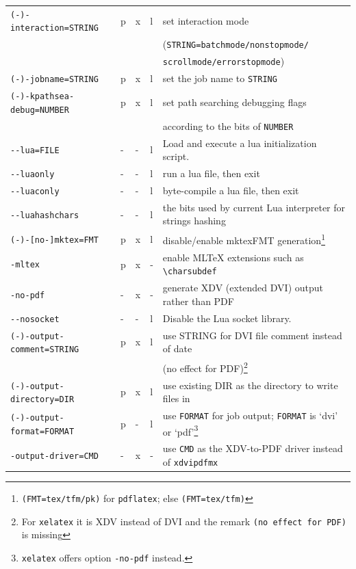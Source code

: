 \documentclass[a4paper]{article}%
\newcommand{\pdflatex}{\texttt{pdflatex}}
\newcommand{\xelatex}{\texttt{xelatex}}
\begin{document}
{\begin{longtable}{lllll}
\texttt{(-)-interaction=STRING}    & p&x&l & set interaction mode \\
                                   &  & &  & (\texttt{STRING=batchmode/nonstopmode/} \\
                                   &  & &  &  \texttt{scrollmode/errorstopmode}) \\
\texttt{(-)-jobname=STRING}        & p&x&l & set the job name to \texttt{STRING} \\
\texttt{(-)-kpathsea-debug=NUMBER} & p&x&l & set path searching debugging flags \\
                                   &  & &  & according to the bits of \texttt{NUMBER} \\
\texttt{-{}-lua=FILE}              & -&-&l & Load and execute a lua initialization script. \\
\texttt{-{}-luaonly}               & -&-&l & run a lua file, then exit \\
\texttt{-{}-luaconly}              & -&-&l & byte-compile a lua file, then exit \\
\texttt{-{}-luahashchars}          & -&-&l & the bits used by current Lua interpreter for strings hashing \\
 \texttt{(-)-[no-]mktex=FMT}       & p&x&l & disable/enable mktexFMT generation\footnote%
{\texttt{(FMT=tex/tfm/pk)} for \pdflatex; else \texttt{(FMT=tex/tfm)}} \\
\texttt{-mltex}                    & p&x&- & enable MLTeX extensions such as \texttt{\textbackslash{}charsubdef} \\
\texttt{-no-pdf}                   & -&x&- & generate XDV (extended DVI) output rather than PDF \\
\texttt{-{}-nosocket}              & -&-&l & Disable the Lua socket library. \\
\texttt{(-)-output-comment=STRING} & p&x&l & use STRING for DVI file comment instead of date \\
                                   &  & &  & (no effect for PDF)\footnote%
{For \xelatex{} it is XDV instead of DVI and the remark \texttt{(no effect for PDF)} is missing} \\
\texttt{(-)-output-directory=DIR}  & p&x&l & use existing DIR as the directory to write files in \\
\texttt{(-)-output-format=FORMAT}  & p&-&l & use \texttt{FORMAT} for job output; \texttt{FORMAT} is `dvi' or `pdf'\footnote%
{\xelatex{} offers option \texttt{-no-pdf} instead. } \\
\texttt{-output-driver=CMD}        & -&x&- & use \texttt{CMD} as the XDV-to-PDF driver instead of \texttt{xdvipdfmx} \\

\end{longtable}}
\end{document}
